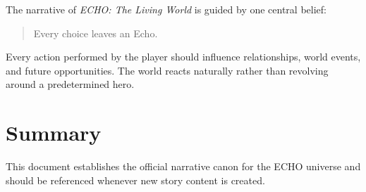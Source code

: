 The narrative of \textit{ECHO: The Living World} is guided by one central belief:

\begin{quote}
Every choice leaves an Echo.
\end{quote}

Every action performed by the player should influence relationships, world events, and future opportunities. The world reacts naturally rather than revolving around a predetermined hero.

\section{Summary}

This document establishes the official narrative canon for the ECHO universe and should be referenced whenever new story content is created.
